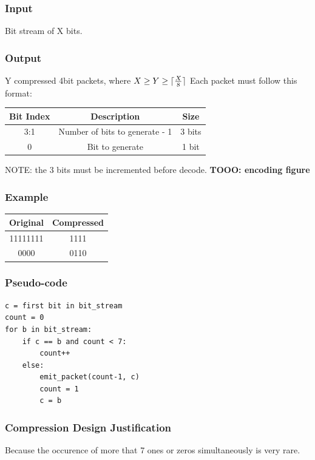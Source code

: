 \documentclass[12pt]{report}
\DeclarePairedDelimiter\ceil{\lceil}{\rceil}
\begin{document}
\subsubsection{Input}
Bit stream of X bits.

\subsubsection{Output}
Y compressed 4bit packets, where $X \geq Y \geq \ceil{\frac{X}{8}}$
Each packet must follow this format:

\begin{center}
 \begin{tabular}{||c c c||} 
 \hline
 Bit Index & Description & Size \\ [0.5ex] 
 \hline\hline
  3:1 & Number of bits to generate - 1 & 3 bits  \\ 
 \hline
 0  & Bit to generate &  1 bit \\ [1ex] 
 \hline
\end{tabular}
\end{center}
NOTE: the 3 bits must be incremented before decode.
\textbf{TOOO: encoding figure}

\subsubsection{Example}

\begin{center}
 \begin{tabular}{||c c||} 
 \hline
 Original & Compressed \\ [0.5ex] 
 \hline\hline
  11111111 & 1111 \\ 
 \hline
 0000  & 0110 \\ [1ex] 
 \hline
\end{tabular}
\end{center}

\subsubsection{Pseudo-code}
\begin{verbatim}
c = first bit in bit_stream
count = 0
for b in bit_stream:
    if c == b and count < 7:
        count++
    else:
        emit_packet(count-1, c)
        count = 1
        c = b
\end{verbatim}

\subsubsection{Compression Design Justification}
Because the occurence of more that 7 ones or zeros simultaneously is very rare.
\end{document}

